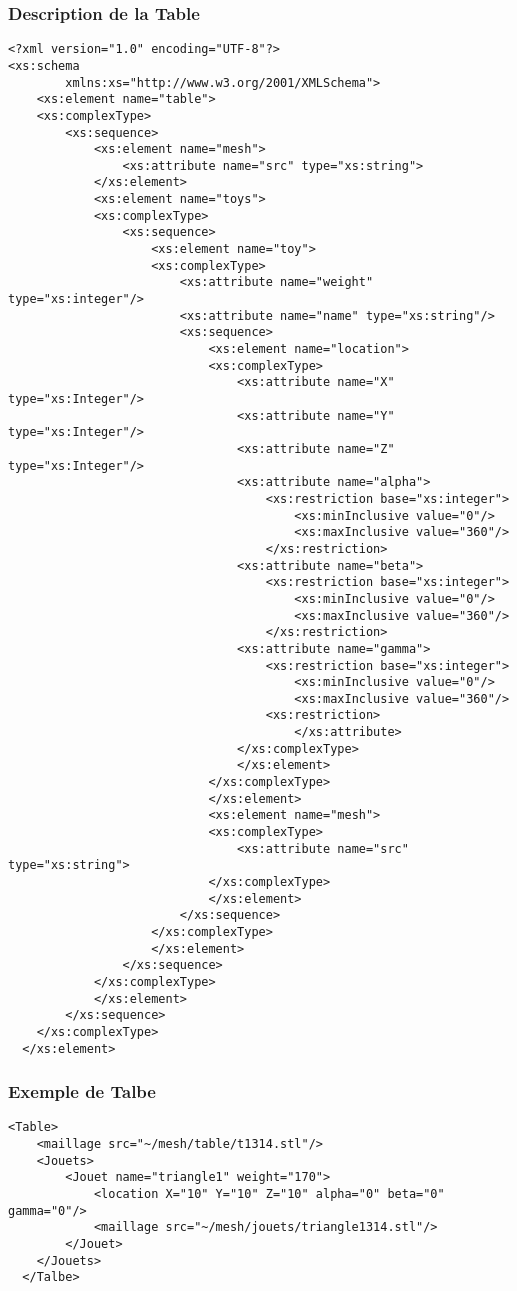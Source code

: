 \subsubsection{Description de la Table}
 \begin{lstlisting}[caption=Description de la Table, label=desctable]
<?xml version="1.0" encoding="UTF-8"?>
<xs:schema
        xmlns:xs="http://www.w3.org/2001/XMLSchema">
    <xs:element name="table">
    <xs:complexType>
        <xs:sequence>
            <xs:element name="mesh">
                <xs:attribute name="src" type="xs:string">
            </xs:element>
            <xs:element name="toys">
            <xs:complexType>
                <xs:sequence>
                    <xs:element name="toy">
                    <xs:complexType>
                        <xs:attribute name="weight" type="xs:integer"/>
                        <xs:attribute name="name" type="xs:string"/>
                        <xs:sequence>
                            <xs:element name="location">
                            <xs:complexType>
								<xs:attribute name="X" type="xs:Integer"/>
								<xs:attribute name="Y" type="xs:Integer"/>
								<xs:attribute name="Z" type="xs:Integer"/>
								<xs:attribute name="alpha">
									<xs:restriction base="xs:integer">
										<xs:minInclusive value="0"/>
										<xs:maxInclusive value="360"/>
									</xs:restriction> 
								<xs:attribute name="beta">
									<xs:restriction base="xs:integer">
										<xs:minInclusive value="0"/>
										<xs:maxInclusive value="360"/>
									</xs:restriction>
                                <xs:attribute name="gamma">
									<xs:restriction base="xs:integer">
										<xs:minInclusive value="0"/>
										<xs:maxInclusive value="360"/>
									<xs:restriction>
										</xs:attribute>
								</xs:complexType>
								</xs:element>
                            </xs:complexType>
                            </xs:element>
                            <xs:element name="mesh">
                            <xs:complexType>
                                <xs:attribute name="src" type="xs:string">
                            </xs:complexType>
                            </xs:element>
                        </xs:sequence>
                    </xs:complexType>
                    </xs:element>
                </xs:sequence>
            </xs:complexType>
            </xs:element>
        </xs:sequence>
    </xs:complexType>
  </xs:element>
  \end{lstlisting}
  
\subsubsection{Exemple de Talbe}
  \begin{lstlisting}[caption=Description de la Table, label=desctable]
  <Table>
	<maillage src="~/mesh/table/t1314.stl"/>
	<Jouets>
		<Jouet name="triangle1" weight="170">
			<location X="10" Y="10" Z="10" alpha="0" beta="0" gamma="0"/>
			<maillage src="~/mesh/jouets/triangle1314.stl"/>
		</Jouet>
	</Jouets>
  </Talbe>
  \end{lstlisting}
